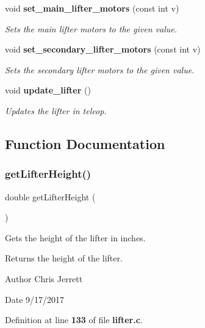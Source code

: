 \begin{DoxyCompactItemize}
void \textbf{ set\+\_\+main\+\_\+lifter\+\_\+motors} (const int v)
\begin{DoxyCompactList}\small\item\em Sets the main lifter motors to the given value. \end{DoxyCompactList}\item 
void \textbf{ set\+\_\+secondary\+\_\+lifter\+\_\+motors} (const int v)
\begin{DoxyCompactList}\small\item\em Sets the secondary lifter motors to the given value. \end{DoxyCompactList}\item 
void \textbf{ update\+\_\+lifter} ()
\begin{DoxyCompactList}\small\item\em Updates the lifter in teleop. \end{DoxyCompactList}\end{DoxyCompactItemize}


\subsection{Function Documentation}
\mbox{\label{lifter_8c_a2719740958fd8a5926f88f6194e820e3}} 
\subsubsection{get\+Lifter\+Height()}
{\footnotesize\ttfamily double get\+Lifter\+Height (\begin{DoxyParamCaption}{ }\end{DoxyParamCaption})}



Gets the height of the lifter in inches. 

\begin{DoxyReturn}{Returns}
the height of the lifter. 
\end{DoxyReturn}
\begin{DoxyAuthor}{Author}
Chris Jerrett 
\end{DoxyAuthor}
\begin{DoxyDate}{Date}
9/17/2017 
\end{DoxyDate}


Definition at line \textbf{ 133} of file \textbf{ lifter.\+c}.



